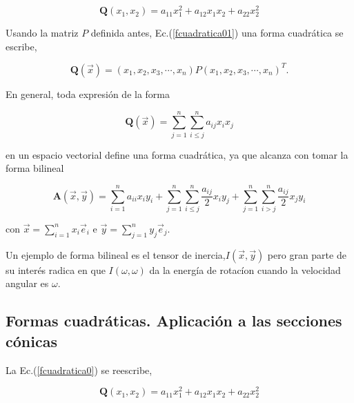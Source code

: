 \bigskip


\begin{example}
$$\mathbf{Q}(x_1,x_2)=a_{11}x_1^{2}+a_{12}x_1x_2+a_{22}x_2^{2}$$
\end{example}



Usando la matriz $P$  definida antes, Ec.(\ref{fcuadratica01}) una forma cuadrática se escribe,






$$\mathbf{Q}(\vec{x})=(x_1, x_2, x_3, \cdots, x_n)P  (x_1, x_2, x_3, \cdots, x_n) ^{T}.$$


\bigskip

En general, toda expresión de la forma

$$\mathbf{Q}(\vec{x})=\sum^{n}_{j=1} \sum^{n}_{i \le j }  a_{ij} x_i x_j$$


\bigskip


\noindent
en un espacio vectorial define una forma cuadrática, ya que alcanza con tomar la forma bilineal 
  
\[
\mathbf{A}(\vec{x},\vec{y})= \sum^{n}_{i=1} a_{ii} x_i y_i  + \sum^{n}_{j=1} \sum^{n}_{i \le j } \frac{a_{ij}}{2} x_i y_j +  \sum^{n}_{j=1} \sum^{n}_{i  > j } \frac{a_{ij}}{2}  x_j y_i  
\]

  

    
  
con   $\vec{x}= \sum^{n}_{i=1}  x_i \vec{e}_i$ e  $\vec{y}= \sum^{n}_{j=1}  y_j \vec{e}_j$.

%


 \bigskip


 \bigskip
 
\begin{remark}
Un ejemplo de forma bilineal   es el tensor de inercia,$I(\vec{x}, \vec{y})$ pero gran parte de su interés
radica en que $I(\omega, \omega)$ da la energía de rotacíon cuando la velocidad angular es $\omega$.
\end{remark}

 \bigskip

 
\subsection{Formas cuadráticas. Aplicación a las secciones cónicas}


La Ec.(\ref{fcuadratica0}) se reescribe, 

$$\mathbf{Q}(x_1,x_2)=a_{11}x_1^{2}+a_{12}x_1x_2+a_{22}x_2^{2}$$


